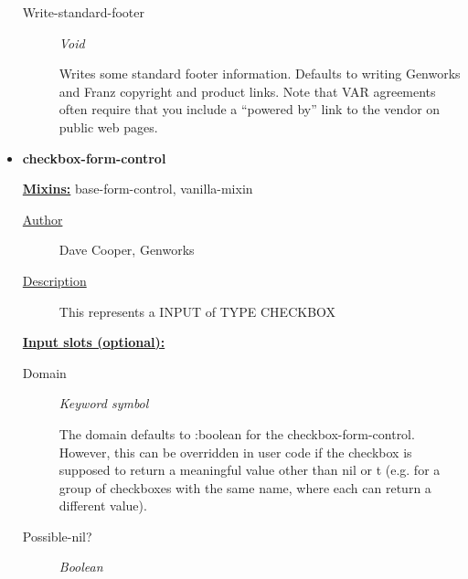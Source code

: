 \documentclass [11pt]{book}
\begin{document}
\begin{itemize}
\begin{description}
\item [Write-standard-footer]
\emph{Void}

 Writes some standard footer information. Defaults to writing Genworks and Franz
copyright and product links. Note that VAR agreements often require that you include a ``powered by''
link to the vendor on public web pages.




\end{description}







\item {}
\label{prim:checkbox-form-control}
\textbf{checkbox-form-control}


\textbf{
\underline{Mixins:}} base-form-control, vanilla-mixin





\begin{description}

\item [
\underline{Author}]


Dave Cooper, Genworks



\item [
\underline{Description}]


This represents a INPUT of TYPE CHECKBOX



\end{description}








\textbf{
\underline{Input slots (optional):}}

\begin{description}

\item [Domain]
\emph{Keyword symbol}

 The domain defaults to :boolean for the checkbox-form-control.
However, this can be overridden in user code if the checkbox is supposed to return
a meaningful value other than nil or t (e.g. for a group of checkboxes with
the same name, where each can return a different value).




\item [Possible-nil?]
\emph{Boolean}


\end{description}
\end{itemize}
\end{document}

